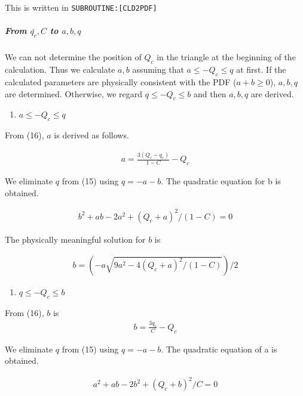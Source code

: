 This is written in \texttt{SUBROUTINE:{[}CLD2PDF{]}}

\hypertarget{from-barq_c-c-to-abq}{%
\subparagraph{\texorpdfstring{From \(\bar{q_c}, C\) to
\(a,b,q\)}{From \textbackslash bar\{q\_c\}, C to a,b,q}}\label{from-barq_c-c-to-abq}}

We can not determine the position of \(Q_c\) in the triangle at the
beginning of the calculation. Thus we calculate \(a,b\) assuming that
\(a \leq-Q_{c} \leq q\) at first. If the calculated parameters are
physically consistent with the PDF (\(a+b \ge 0\)), \(a,b,q\) are
determined. Otherwise, we regard \(q \leq-Q_{c} \leq b\) and then
\(a,b,q\) are derived.

\begin{enumerate}
\def\labelenumi{\arabic{enumi}.}
\tightlist
\item
  \(a \leq-Q_{c} \leq q\)
\end{enumerate}

From (16), \(a\) is derived as follows.

\begin{eqnarray}
a =\frac{3\left(Q_{c}-q_{c}\right)}{1-C}-Q_{c}
\end{eqnarray}

We eliminate \(q\) from (15) using \(q = -a-b\). The quadratic equation
for b is obtained.

\begin{eqnarray}
b^{2}+ab-2a^{2}+\left(Q_{c}+a\right)^{2} /(1-C)=0
\label{E08-17}
\end{eqnarray}

The physically meaningful solution for \(b\) is

\begin{eqnarray}
b=\left(-a\sqrt{9 a^{2}-4\left(Q_{c}+a\right)^{2} /(1-C)}\right) / 2
\label{E08-18}
\end{eqnarray}

\begin{enumerate}
\def\labelenumi{\arabic{enumi}.}
\setcounter{enumi}{1}
\tightlist
\item
  \(q \leq-Q_{c} \leq b\)
\end{enumerate}

From (16), \(b\) is \begin{eqnarray}
b=\frac{3 q_{c}}{C}-Q_{c}
\end{eqnarray}

We eliminate \(q\) from (15) using \(q = -a-b\). The quadratic equation
of a is obtained.

\begin{eqnarray}
a^{2}+ab-2 b^{2}+\left(Q_{c}+b\right)^{2} / C=0
\label{E08-17}
\end{eqnarray}

